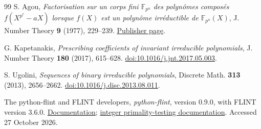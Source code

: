 \documentclass[11pt]{article}
\theoremstyle{definition}
\theoremstyle{remark}
\begin{document}
\begin{thebibliography}{99}
S. Agou,
\emph{Factorisation sur un corps fini $\mathbb F_{p^n}$ des
polyn\^omes compos\'es $f(X^{p^r}-aX)$ lorsque $f(X)$ est un
polyn\^ome irr\'eductible de $\mathbb F_{p^n}(X)$},
J. Number Theory \textbf{9} (1977), 229--239.
\href{https://www.sciencedirect.com/science/article/pii/0022314X77900270}{Publisher page}.

G. Kapetanakis,
\emph{Prescribing coefficients of invariant irreducible polynomials},
J. Number Theory \textbf{180} (2017), 615--628.
\href{https://doi.org/10.1016/j.jnt.2017.05.003}{doi:10.1016/j.jnt.2017.05.003}.

S. Ugolini,
\emph{Sequences of binary irreducible polynomials},
Discrete Math. \textbf{313} (2013), 2656--2662.
\href{https://doi.org/10.1016/j.disc.2013.08.011}{doi:10.1016/j.disc.2013.08.011}.

The python-flint and FLINT developers,
\emph{python-flint}, version 0.9.0, with FLINT version 3.6.0.
\href{https://python-flint.readthedocs.io/}{Documentation};
\href{https://flintlib.org/doc/fmpz.html}{integer primality-testing documentation}.
Accessed 27 October 2026.

\end{thebibliography}
\end{document}
